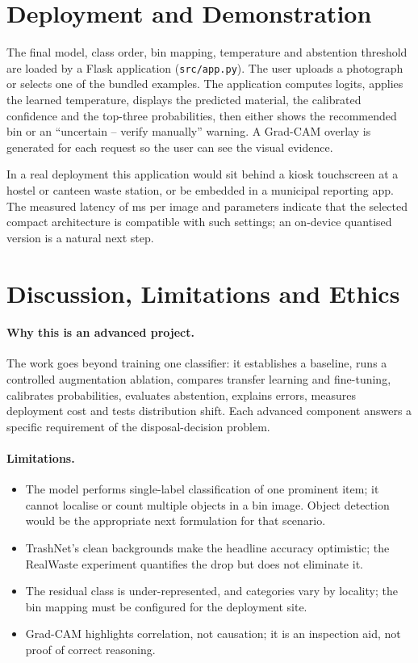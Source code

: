 \documentclass[11pt,a4paper]{article}
\begin{document}
\section{Deployment and Demonstration}
\label{sec:demo}

The final model, class order, bin mapping, temperature and abstention threshold are loaded
by a Flask application (\texttt{src/app.py}). The user uploads a photograph or selects one
of the bundled examples. The application computes logits, applies the learned temperature,
displays the predicted material, the calibrated confidence and the top-three probabilities,
then either shows the recommended bin or an ``uncertain -- verify manually'' warning. A
Grad-CAM overlay is generated for each request so the user can see the visual evidence.

In a real deployment this application would sit behind a kiosk touchscreen at a hostel or
canteen waste station, or be embedded in a municipal reporting app. The measured latency
of \finalLatency{} ms per image and \finalParams{} parameters indicate that the selected
compact architecture is compatible with such settings; an on-device quantised version is a
natural next step.

\section{Discussion, Limitations and Ethics}
\label{sec:discussion}

\paragraph{Why this is an advanced project.} The work goes beyond training one classifier:
it establishes a baseline, runs a controlled augmentation ablation, compares transfer
learning and fine-tuning, calibrates probabilities, evaluates abstention, explains errors,
measures deployment cost and tests distribution shift. Each advanced component answers a
specific requirement of the disposal-decision problem.

\paragraph{Limitations.}
\begin{itemize}
  \item The model performs single-label classification of one prominent item; it cannot
        localise or count multiple objects in a bin image. Object detection would be the
        appropriate next formulation for that scenario.
  \item TrashNet's clean backgrounds make the headline accuracy optimistic; the RealWaste
        experiment quantifies the drop but does not eliminate it.
  \item The residual class is under-represented, and categories vary by locality; the bin
        mapping must be configured for the deployment site.
  \item Grad-CAM highlights correlation, not causation; it is an inspection aid, not proof
        of correct reasoning.
\end{itemize}
\end{document}
